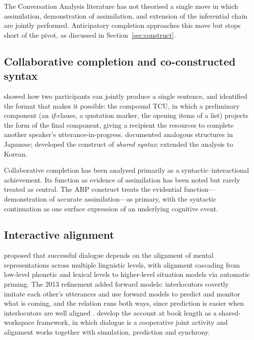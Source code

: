 The Conversation Analysis literature has not theorised a single move in which assimilation, demonstration of assimilation, and extension of the inferential chain are jointly performed. Anticipatory completion \citep{Lerner1991,Lerner1996,Hayashi2003} approaches this move but stops short of the pivot, as discussed in Section~\ref{sec:construct}.

\subsection{Collaborative completion and co-constructed syntax}

\citet{Lerner1991} showed how two participants can jointly produce a single sentence, and identified the format that makes it possible: the compound TCU, in which a preliminary component (an \emph{if}-clause, a quotation marker, the opening items of a list) projects the form of the final component, giving a recipient the resources to complete another speaker's utterance-in-progress. \citet{Hayashi2003} documented analogous structures in Japanese; \citet{Helasvuo2004} developed the construct of \emph{shared syntax}; \citet{Kim2003} extended the analysis to Korean.

Collaborative completion has been analysed primarily as a syntactic--interactional achievement. Its function as evidence of assimilation has been noted but rarely treated as central. The ARP construct treats the evidential function---demonstration of accurate assimilation---as primary, with the syntactic continuation as one surface expression of an underlying cognitive event.

\subsection{Interactive alignment}

\citet{PickeringGarrod2004} proposed that successful dialogue depends on the alignment of mental representations across multiple linguistic levels, with alignment cascading from low-level phonetic and lexical levels to higher-level situation models via automatic priming. The 2013 refinement added forward models: interlocutors covertly imitate each other's utterances and use forward models to predict and monitor what is coming, and the relation runs both ways, since prediction is easier when interlocutors are well aligned \citep[p.~345]{PickeringGarrod2013}. \citet{PickeringGarrod2021} develop the account at book length as a shared-workspace framework, in which dialogue is a cooperative joint activity and alignment works together with simulation, prediction and synchrony.

